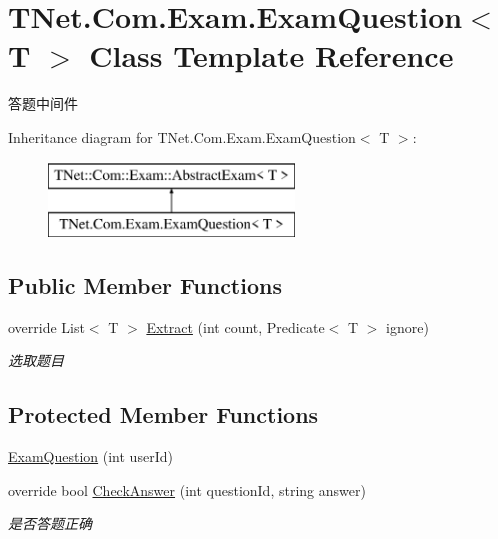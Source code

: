 \hypertarget{class_t_net_1_1_com_1_1_exam_1_1_exam_question}{}\section{T\+Net.\+Com.\+Exam.\+Exam\+Question$<$ T $>$ Class Template Reference}
\label{class_t_net_1_1_com_1_1_exam_1_1_exam_question}


答题中间件  


Inheritance diagram for T\+Net.\+Com.\+Exam.\+Exam\+Question$<$ T $>$\+:\begin{figure}[H]
\begin{center}
\leavevmode
\includegraphics[height=2.000000cm]{class_t_net_1_1_com_1_1_exam_1_1_exam_question}
\end{center}
\end{figure}
\subsection*{Public Member Functions}
\begin{DoxyCompactItemize}
\item 
override List$<$ T $>$ \mbox{\hyperlink{class_t_net_1_1_com_1_1_exam_1_1_exam_question_a52cc7c3b0257b8a9ee5a9e9de4880ef2}{Extract}} (int count, Predicate$<$ T $>$ ignore)
\begin{DoxyCompactList}\small\item\em 选取题目 \end{DoxyCompactList}\end{DoxyCompactItemize}
\subsection*{Protected Member Functions}
\begin{DoxyCompactItemize}
\item 
\mbox{\hyperlink{class_t_net_1_1_com_1_1_exam_1_1_exam_question_a0797783e49d7716c88ddb5ba30e9b6e4}{Exam\+Question}} (int user\+Id)
\item 
override bool \mbox{\hyperlink{class_t_net_1_1_com_1_1_exam_1_1_exam_question_acda26f165e3790cb094ee63d4c1d9cf5}{Check\+Answer}} (int question\+Id, string answer)
\begin{DoxyCompactList}\small\item\em 是否答题正确 \end{DoxyCompactList}\end{DoxyCompactItemize}
